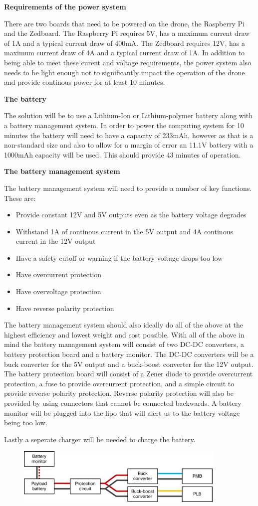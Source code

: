 \textbf{Requirements of the power system}

There are two boards that need to be powered on the drone, the Raspberry Pi and the Zedboard. The Raspberry Pi requires
5V, has a maximum current draw of 1A and a typical current draw of 400mA. The Zedboard requires 12V, has a maximum current draw of
4A and a typical current draw of 1A. In addition to being able to meet these curent and voltage requirements, the power system also
needs to be light enough not to significantly impact the operation of the drone and provide continous power for at least 10 minutes.

\textbf{The battery}

The solution will be to use a Lithium-Ion or Lithium-polymer battery along with a battery management system. In order to
power the computing system for 10 minutes the battery will need to have a capacity of 233mAh, however as that is a non-standard size and also to allow for a margin of error an 11.1V battery with a 1000mAh capacity will be used. This should provide 43 minutes of operation.

\textbf{The battery management system}

The battery management system will need to provide a number of key functions. These are:
  
  \begin{itemize}
\item Provide constant 12V and 5V outputs even as the battery voltage degrades
\item Withstand 1A of continous current in the 5V output and 4A continous current in the 12V output
\item Have a safety cutoff or warning if the battery voltage drops too low
\item Have overcurrent protection
\item Have overvoltage protection
\item Have reverse polarity protection
\end{itemize}
 
The battery management system should also ideally do all of the above at the highest efficiency and lowest weight and cost possible. With all of the above in mind the battery management system will consist of two DC-DC converters, a battery protection board and a battery monitor. The DC-DC converters will be a buck converter for the 5V output and a buck-boost converter for the 12V output. The battery protection board will consist of a Zener diode to provide overcurrent protection, a fuse to provide overcurrent protection, and a simple circuit to provide reverse polarity protection. Reverse polarity protection will also be provided by using connectors that cannot be connected backwards. A battery monitor will be plugged into the lipo that will alert us to the battery voltage being too low.

Lastly a seperate charger will be needed to charge the battery.

\begin{figure}\label{Overview}
\centering
\includegraphics[width=10cm]{img/Power_Diagram.png}
\end{figure}
